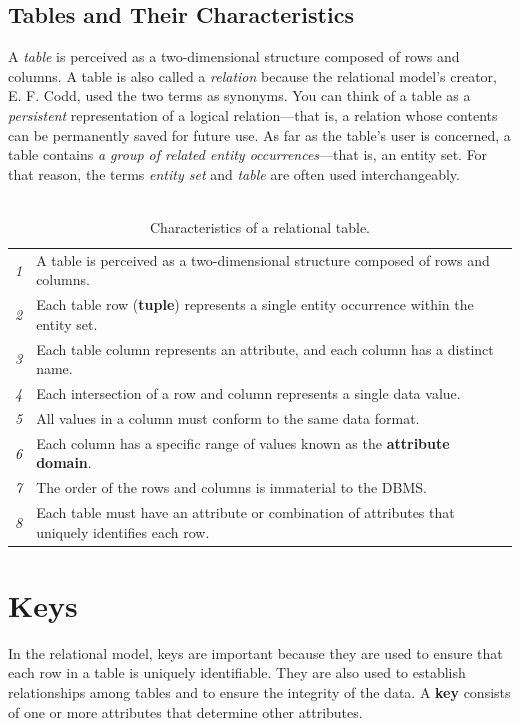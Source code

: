 \documentclass[a4paper, 12pt, titlepage]{report}
\begin{document}
\subsection{Tables and Their Characteristics}
A \emph{table} is perceived as a two-dimensional structure composed of rows and columns. A table is also called a \emph{relation} because the relational model’s creator, E. F. Codd, used the two terms as synonyms. You can think of a table as a \emph{persistent} representation of a logical relation—that is, a relation whose contents can be permanently saved for future use. As far as the table’s user is concerned, a table contains \emph{a group of related entity occurrences}—that is, an entity set. For that reason, the terms \emph{entity set} and \emph{table} are often used interchangeably.\\ \\
\begin{center}
\begin{longtable}{ p{0cm} p{14cm} }
\caption{Characteristics of a relational table.\label{long}}\\
\toprule
\toprule
\emph{1} & A table is perceived as a two-dimensional structure composed of rows and columns.\\ 
\emph{2} & Each table row (\textbf{tuple}) represents a single entity occurrence within the entity set.\\
\emph{3} & Each table column represents an attribute, and each column has a distinct name.\\
\emph{4} & Each intersection of a row and column represents a single data value.\\
\emph{5} & All values in a column must conform to the same data format.\\
\emph{6} & Each column has a specific range of values known as the \textbf{attribute domain}.\\ 
\emph{7} & The order of the rows and columns is immaterial to the DBMS.\\
\emph{8} & Each table must have an attribute or combination of attributes that uniquely identifies each row.\\
\bottomrule
\bottomrule
\end{longtable}
\end{center}
\section{Keys}
In the relational model, keys are important because they are used to ensure that each row in a table is uniquely identifiable. They are also used to establish relationships among tables and to ensure the integrity of the data. A \textbf{key} consists of one or more attributes that determine other attributes.
\end{document}

